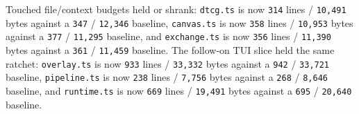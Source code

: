 Touched file/context budgets held or shrank: \texttt{d\allowbreak{}t\allowbreak{}c\allowbreak{}g\allowbreak{}.\allowbreak{}t\allowbreak{}s} is now \texttt{3\allowbreak{}1\allowbreak{}4} lines / \texttt{1\allowbreak{}0\allowbreak{},\allowbreak{}4\allowbreak{}9\allowbreak{}1} bytes against a \texttt{3\allowbreak{}4\allowbreak{}7} / \texttt{1\allowbreak{}2\allowbreak{},\allowbreak{}3\allowbreak{}4\allowbreak{}6} baseline, \texttt{c\allowbreak{}a\allowbreak{}n\allowbreak{}v\allowbreak{}a\allowbreak{}s\allowbreak{}.\allowbreak{}t\allowbreak{}s} is now \texttt{3\allowbreak{}5\allowbreak{}8} lines / \texttt{1\allowbreak{}0\allowbreak{},\allowbreak{}9\allowbreak{}5\allowbreak{}3} bytes against a \texttt{3\allowbreak{}7\allowbreak{}7} / \texttt{1\allowbreak{}1\allowbreak{},\allowbreak{}2\allowbreak{}9\allowbreak{}5} baseline, and \texttt{e\allowbreak{}x\allowbreak{}c\allowbreak{}h\allowbreak{}a\allowbreak{}n\allowbreak{}g\allowbreak{}e\allowbreak{}.\allowbreak{}t\allowbreak{}s} is now \texttt{3\allowbreak{}5\allowbreak{}6} lines / \texttt{1\allowbreak{}1\allowbreak{},\allowbreak{}3\allowbreak{}9\allowbreak{}0} bytes against a \texttt{3\allowbreak{}6\allowbreak{}1} / \texttt{1\allowbreak{}1\allowbreak{},\allowbreak{}4\allowbreak{}5\allowbreak{}9} baseline. The follow-on TUI slice held the same ratchet: \texttt{o\allowbreak{}v\allowbreak{}e\allowbreak{}r\allowbreak{}l\allowbreak{}a\allowbreak{}y\allowbreak{}.\allowbreak{}t\allowbreak{}s} is now \texttt{9\allowbreak{}3\allowbreak{}3} lines / \texttt{3\allowbreak{}3\allowbreak{},\allowbreak{}3\allowbreak{}3\allowbreak{}2} bytes against a \texttt{9\allowbreak{}4\allowbreak{}2} / \texttt{3\allowbreak{}3\allowbreak{},\allowbreak{}7\allowbreak{}2\allowbreak{}1} baseline, \texttt{p\allowbreak{}i\allowbreak{}p\allowbreak{}e\allowbreak{}l\allowbreak{}i\allowbreak{}n\allowbreak{}e\allowbreak{}.\allowbreak{}t\allowbreak{}s} is now \texttt{2\allowbreak{}3\allowbreak{}8} lines / \texttt{7\allowbreak{},\allowbreak{}7\allowbreak{}5\allowbreak{}6} bytes against a \texttt{2\allowbreak{}6\allowbreak{}8} / \texttt{8\allowbreak{},\allowbreak{}6\allowbreak{}4\allowbreak{}6} baseline, and \texttt{r\allowbreak{}u\allowbreak{}n\allowbreak{}t\allowbreak{}i\allowbreak{}m\allowbreak{}e\allowbreak{}.\allowbreak{}t\allowbreak{}s} is now \texttt{6\allowbreak{}6\allowbreak{}9} lines / \texttt{1\allowbreak{}9\allowbreak{},\allowbreak{}4\allowbreak{}9\allowbreak{}1} bytes against a \texttt{6\allowbreak{}9\allowbreak{}5} / \texttt{2\allowbreak{}0\allowbreak{},\allowbreak{}6\allowbreak{}4\allowbreak{}0} baseline.

